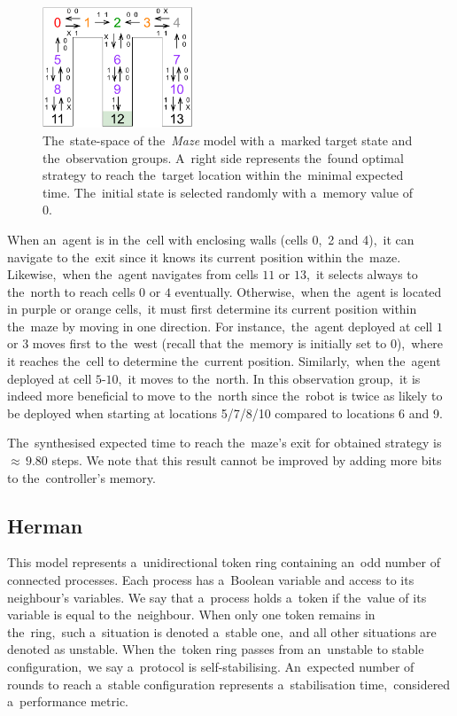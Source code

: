 \begin{figure}[h!]
\centering
\includegraphics[width=0.4\textwidth]{figures/maze.pdf}
\caption{The~state-space of the~\textit{Maze} model with a~marked target state and the~observation groups. A~right side represents the~found optimal strategy to reach the~target location within the~minimal expected time. The~initial state is selected randomly with a~memory value of 0.}%
\label{fig:maze}%
\end{figure}

When an~agent is in the~cell with enclosing walls (cells 0,~2 and 4),~it can navigate to the~exit since it knows its current position within the~maze.
Likewise,~when the~agent navigates from cells $11$ or $13$,~it selects always to the~north to reach cells $0$ or $4$ eventually.
Otherwise,~when the~agent is located in purple or orange cells,~it must first determine its current position within the~maze by moving in one direction.
For instance,~the~agent deployed at cell $1$ or $3$ moves first to the~west (recall that the~memory is initially set to 0),~where it reaches the~cell to determine the~current position.
Similarly,~when the~agent deployed at cell $5$-$10$,~it moves to the~north.
In this observation group,~it is indeed more beneficial to move to the~north since the~robot is twice as likely to be deployed when starting at locations 5/7/8/10 compared to locations 6 and 9.

The~synthesised expected time to reach the~maze's exit for obtained strategy is ${\approx} \, 9.80$ steps. 
We note that this result cannot be improved by adding more bits to the~controller's memory.

\subsection{Herman} \label{sec:herman}
This model represents a~unidirectional token ring containing an~odd number of connected processes.
Each process has a~Boolean variable and access to its neighbour's variables.
We say that a~process holds a~token if the~value of its variable is equal to the~neighbour.
When only one token remains in the~ring,~such a~situation is denoted a~stable one,~and all other situations are denoted as unstable.
When the~token ring passes from an~unstable to stable configuration,~we say a~protocol is self-stabilising.
An~expected number of rounds to reach a~stable configuration represents a~stabilisation time,~considered a~performance metric.

